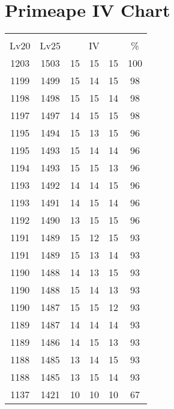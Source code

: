 \documentclass{article}%
\begin{document}
%
\normalsize%
\section{Primeape IV Chart}%
\label{sec:Primeape IV Chart}%
\renewcommand{\arraystretch}{1.5}%
\begin{tabular}{|c|c|c|c|c|c|}%
\hline%
\multicolumn{6}{|c|}{\textcolor{white}{ 
\linebreak{Primeape}
}%
\cellcolor{black}}\\%
\multicolumn{1}{|c}{Lv20}&\multicolumn{1}{c|}{Lv25}&\multicolumn{3}{c|}{IV}&\multicolumn{1}{|c|}{\%}\\%
\hline%
\rowcolor{color100}%
1203&1503&15&15&15&100\\%
\hline%
\rowcolor{color98}%
1199&1499&15&14&15&98\\%
\hline%
\rowcolor{color98}%
1198&1498&15&15&14&98\\%
\hline%
\rowcolor{color98}%
1197&1497&14&15&15&98\\%
\hline%
\rowcolor{color96}%
1195&1494&15&13&15&96\\%
\hline%
\rowcolor{color96}%
1195&1493&15&14&14&96\\%
\hline%
\rowcolor{color96}%
1194&1493&15&15&13&96\\%
\hline%
\rowcolor{color96}%
1193&1492&14&14&15&96\\%
\hline%
\rowcolor{color96}%
1193&1491&14&15&14&96\\%
\hline%
\rowcolor{color96}%
1192&1490&13&15&15&96\\%
\hline%
\rowcolor{color93}%
1191&1489&15&12&15&93\\%
\hline%
\rowcolor{color93}%
1191&1489&15&13&14&93\\%
\hline%
\rowcolor{color93}%
1190&1488&14&13&15&93\\%
\hline%
\rowcolor{color93}%
1190&1488&15&14&13&93\\%
\hline%
\rowcolor{color93}%
1190&1487&15&15&12&93\\%
\hline%
\rowcolor{color93}%
1189&1487&14&14&14&93\\%
\hline%
\rowcolor{color93}%
1189&1486&14&15&13&93\\%
\hline%
\rowcolor{color93}%
1188&1485&13&14&15&93\\%
\hline%
\rowcolor{color93}%
1188&1485&13&15&14&93\\%
\hline%
\rowcolor{color91}%
1137&1421&10&10&10&67\\%
\end{tabular}

%
\end{document}
